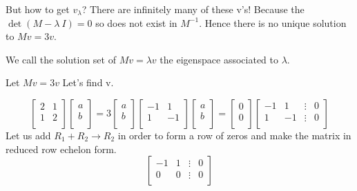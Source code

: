 But how to get $v_{\lambda}$?
There are infinitely many of these v's! Because the $\det(M-\lambda~I) = 0$ so %
 does not exist in $M^{-1}$. Hence there is no unique solution to $Mv = 3v$.

 \begin{definition}
     We call the solution set of $Mv = \lambda v$ the eigenspace associated to $\lambda$.
 \end{definition}
 \begin{exmp}
     Let $Mv = 3v$ Let's find v.
 \end{exmp}
\[ \begin{bmatrix}
        2   &   1 \\
        1   &   2 \\
    \end{bmatrix}
    \begin{bmatrix}
        a \\
        b \\
    \end{bmatrix} 
    = 3 
    \begin{bmatrix}
        a \\
        b \\
    \end{bmatrix} 
    \begin{bmatrix}
        -1  &   1 \\
        1   &   -1 \\
    \end{bmatrix}
    \begin{bmatrix}
        a \\
        b \\
    \end{bmatrix}
    = \begin{bmatrix}
        0 \\
        0 \\
    \end{bmatrix}
    \begin{bmatrix}
        -1  &   1   & \vdots & 0\\
        1   &   -1  & \vdots & 0\\
    \end{bmatrix}\]
    Let us add $R_1 + R_2 \rightarrow R_2$ in order to form a row of zeros and make the matrix in reduced row echelon form.
    \[ \begin{bmatrix}
            -1  &   1   &   \vdots & 0\\
            0   &   0   &   \vdots & 0\\
        \end{bmatrix} \]

